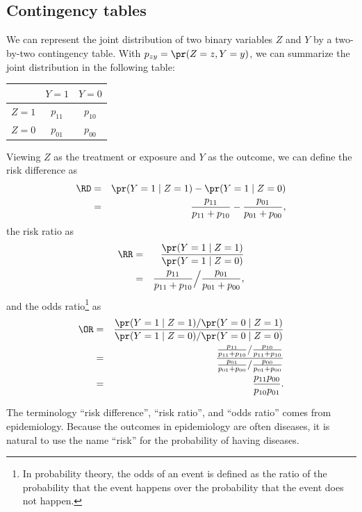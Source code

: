  
 
 \subsection{Contingency tables}
 \label{sec::twobytwotables-withresume}
 
 We can represent the joint distribution of two binary variables $Z$ and $Y$ by a two-by-two contingency table. With $p_{zy} = \pr( Z=z, Y=y )$, we can summarize the joint distribution in the following table:
 
 
 \begin{center}
\begin{tabular}{lcc}
\hline 
        & $Y =1$ & $Y =0$\\\hline
$Z =1$ & $p_{11}$ & $p_{10}$\\ 
$Z =0$ & $p_{01}$ & $p_{00}$\\ 
\hline 
\end{tabular}
\end{center}
 
 
 Viewing $Z$ as the treatment or exposure and $Y$ as the outcome, we can define the risk difference as
\begin{eqnarray*}
\RD  &=& \pr(Y=1\mid Z=1) - \pr(Y=1\mid Z=0)  \\
&=& \frac{p_{11}}{ p_{11} + p_{10} } -  \frac{p_{01}}{ p_{01} + p_{00} } ,
\end{eqnarray*}
 the risk ratio as
\begin{eqnarray*}
 \RR &=&  \frac{ \pr(Y=1\mid Z=1)  }{    \pr(Y=1\mid Z=0)    }  \\
& =&   \frac{p_{11}}{ p_{11} + p_{10} }  \Big /  \frac{p_{01}}{ p_{01} + p_{00} } ,
\end{eqnarray*}
 and the odds ratio\footnote{In probability theory, the odds of an event is defined as the ratio of the probability that the event happens over the probability that the event does not happen.} as
\begin{eqnarray*}
 \OR &=& \frac{ \pr(Y=1\mid Z=1) /  \pr(Y=0\mid Z=1)  }{    \pr(Y=1\mid Z=0) /\pr(Y=0\mid Z=0)   }  \\
& =& \frac{      \frac{p_{11}}{ p_{11} + p_{10} } /  \frac{p_{10}}{ p_{11} + p_{10} }  }{  \frac{p_{01}}{ p_{01} + p_{00} } / \frac{p_{00}}{ p_{01} + p_{00} }     }  \\
 &=& \frac{ p_{11} p_{00}  }{  p_{10} p_{01} }.
\end{eqnarray*}

The terminology ``risk difference'', ``risk ratio'', and ``odds ratio'' comes from epidemiology. Because the outcomes in epidemiology are often diseases, it is natural to use the name ``risk'' for the probability of having diseases. 
 
